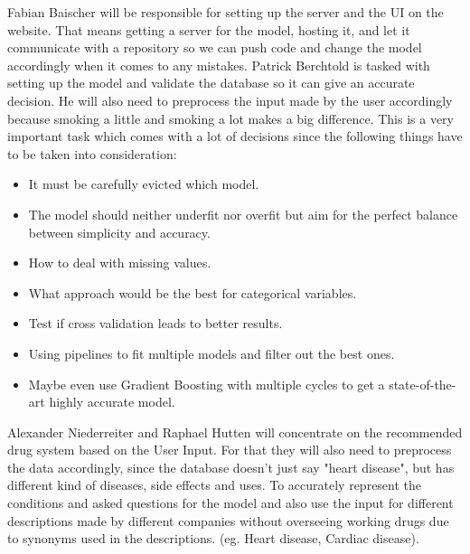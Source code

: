 \documentclass{article}
\begin{document}
Fabian Baischer will be responsible for setting up the server and the UI on the website. That means getting a server for the model, hosting it, and let it communicate with a repository so we can push code and change the model accordingly when it comes to any mistakes.
Patrick Berchtold is tasked with setting up the model and validate the database so it can give an accurate decision. He will also need to preprocess the input made by the user accordingly because smoking a little and smoking a lot makes a big difference. This is a very important task which comes with a lot of decisions since the following things have to be taken into consideration:
\begin{itemize}
    \item It must be carefully evicted which model. 
    \item The model should neither underfit nor overfit but aim for the perfect balance between simplicity and accuracy.
    \item How to deal with missing values.
    \item What approach would be the best for categorical variables.
    \item Test if cross validation leads to better results.
    \item Using pipelines to fit multiple models and filter out the best ones.
    \item Maybe even use Gradient Boosting with multiple cycles to get a state-of-the-art highly accurate model.
\end{itemize}

Alexander Niederreiter and Raphael Hutten will concentrate on the recommended drug system based on the User Input. For that they will also need to preprocess the data accordingly, since the database doesn't just say "heart disease", but has different kind of diseases, side effects and uses. To accurately represent the conditions and asked questions for the model and also use the input for different descriptions made by different companies without overseeing working drugs due to synonyms used in the descriptions. (eg. Heart disease, Cardiac disease).
\end{document}
